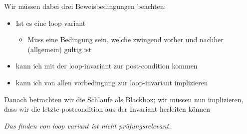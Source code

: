 Wir müssen dabei drei Beweisbedingungen beachten:
\begin{itemize}
	\item Ist es eine loop-variant \begin{itemize}
		\item Muss eine Bedingung sein, welche zwingend vorher und nachher (allgemein) gültig ist
	\end{itemize}
	\item kann ich mit der loop-invariant zur post-condition kommen
	\item kann ich von allen vorbedingung zur loop-invariant implizieren
\end{itemize}

Danach betrachten wir die Schlaufe als Blackbox; wir müssen nun implizieren, dass wir die letzte postcondition aus der Invariant herleiten können

\textit{Das finden von loop variant ist nicht prüfungsrelevant.}



